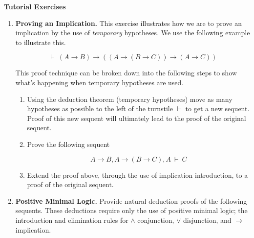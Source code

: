 \documentclass[11pt]{report}
\begin{document}
\newpage
{\bf Tutorial Exercises}
\begin{enumerate}

	\item \textbf{Proving an Implication.} This exercise illustrates how we are to prove an implication by the use of \emph{temporary} hypotheses. We use the following example to illustrate this.
	
	$$\vdash \ (A \to B) \to ((A \to (B \to C)) \to (A \to C))$$

	This proof technique can be broken down into the following steps to show what's happening when temporary hypotheses are used. 

	\begin{enumerate}

		\item Using the deduction theorem (temporary hypotheses) move as many hypotheses as possible to the left of the turnstile $\vdash$ to get a new sequent. Proof of this new sequent will ultimately lead to the proof of the original sequent. 

		\item Prove the following sequent 
		
		$$ A \to B, A \to (B \to C), A \ \vdash \ C$$

		\item Extend the proof above, through the use of implication introduction, to a proof of the original sequent.

	\end{enumerate}
	
	\item \textbf{Positive Minimal Logic.} Provide natural deduction proofs of the following sequents. These deductions require only the use of positive minimal logic; the introduction and elimination rules for $\land$ conjunction, $\lor$ disjunction, and $\to$ implication. 
	 

\end{enumerate}
\end{document}
